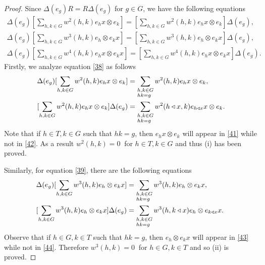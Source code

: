 \documentclass[a4paper,11pt]{amsart}
\numberwithin{equation}{section}
\begin{document}
\begin{proof}
Since $\Delta(e_g)R=R\Delta(e_g)$ for $g\in G$, we have the following equations
\begin{gather}
       \Delta(e_g) [\sum\limits_{h,k \in G}w^2(h,k)e_{h}x \otimes e_{k}]=[\sum\limits_{h,k \in G}w^2(h,k)e_{h}x \otimes e_{k}] \Delta(e_g),\label{38}\\
		\Delta(e_g) [\sum\limits_{h,k \in G}w^3(h,k)e_{h} \otimes e_{k}x]=[\sum\limits_{h,k
 \in G}w^3(h,k)e_{h} \otimes e_{k}x] \Delta(e_g), \label{39}\\
		\Delta(e_g) [\sum\limits_{h,k \in G}w^4(h,k)e_{h}x \otimes e_{k}x]=[\sum\limits_{h,k \in G}w^4(h,k)e_{h}x \otimes e_{k}x] \Delta(e_g).\label{40}
\end{gather}
Firstly, we analyze equation \eqref{38} as follows
\begin{align}
            \Delta(e_g) [\sum\limits_{h,k \in G}w^2(h,k)e_{h}x \otimes e_{k}]&=\sum\limits_{\begin{subarray}{l}  h,k \in G \\
                             hk=g  \\
        \end{subarray}}w^2(h,k)e_{h}x \otimes e_{k}, \label{41}\\
             [\sum\limits_{h,k \in G}w^2(h,k)e_{h}x \otimes e_{k}] \Delta(e_g)&=\sum\limits_{\begin{subarray}{l}  h,k \in G  \\
                             hk=g  \\
        \end{subarray}}w^2(h\triangleleft x,k)e_{h\triangleleft x}x \otimes e_{k}.  \label{42}
\end{align}
Note that if $h \in T,k \in G$ such that $hk=g$, then $e_{h}x \otimes e_{k}$ will appear in \eqref{41} while not in \eqref{42}. As a result $w^2(h,k)=0\ $ for $ h \in T,k \in G$ and thus (i) has been proved.

Similarly, for equation \eqref{39}, there are the following equations
\begin{align}
            \Delta(e_g) [\sum\limits_{h,k \in G}w^3(h,k)e_{h} \otimes e_{k}x]&=\sum\limits_{\begin{subarray}{l}  h,k \in G   \\
                             hk=g  \\
        \end{subarray}}w^3(h,k)e_{h} \otimes e_{k}x,\   \label{43}  \\
              [\sum\limits_{h,k \in G}w^3(h,k)e_{h} \otimes e_{k}x] \Delta(e_g)&=\sum\limits_{\begin{subarray}{l}  h,k \in G   \\
                             hk=g  \\
        \end{subarray}}w^3(h,k \triangleleft x)e_{h} \otimes e_{k \triangleleft x}x.\   \label{44}
\end{align}
Observe that if $h \in G, k \in T$ such that $hk=g$, then $e_{h} \otimes e_{k}x$ will appear in \eqref{43} while not in \eqref{44}. Therefore $w^3(h,k)=0\ $ for $h \in G,k \in T$ and so (ii) is proved.


\end{proof}
\end{document}
